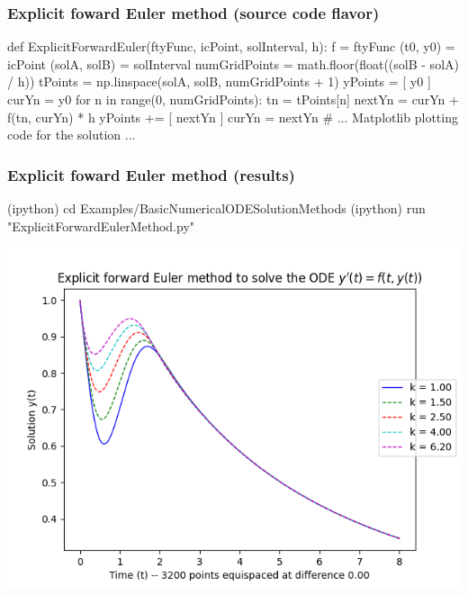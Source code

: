 \documentclass[usenames,svgnames,dvipsnames,10pt]{beamer}
\begin{document}
\begin{frame}[fragile]
\frametitle{Explicit foward Euler method (source code flavor)}

\begin{center}
\begin{pythoncode}
def ExplicitForwardEuler(ftyFunc, icPoint, solInterval, h):
    f = ftyFunc
    (t0, y0) = icPoint
    (solA, solB) = solInterval
    numGridPoints = math.floor(float((solB - solA) / h))
    tPoints = np.linspace(solA, solB, numGridPoints + 1)
    yPoints = [ y0 ]
    curYn = y0
    for n in range(0, numGridPoints):
        tn = tPoints[n]
        nextYn = curYn + f(tn, curYn) * h
        yPoints += [ nextYn ]
        curYn = nextYn
    # ... Matplotlib plotting code for the solution ... 
\end{pythoncode}
\end{center}

\end{frame}

\begin{frame}[fragile]
\frametitle{Explicit foward Euler method (results)}

\begin{center}
\begin{code}
(ipython) cd Examples/BasicNumericalODESolutionMethods
(ipython) run "ExplicitForwardEulerMethod.py"
\end{code}
\vskip -0.205cm
\includegraphics[height=0.76\textheight]{../Images/ExplicitForwardEuler-PlotOutput-v1.png}
\end{center}

\end{frame}
\end{document}
